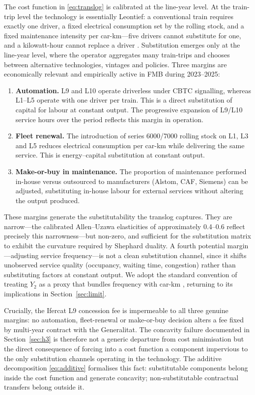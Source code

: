 \documentclass[11pt,a4paper]{article}
\begin{document}
The cost function in \eqref{eq:translog} is calibrated at the line-year
level. At the train-trip level the technology is essentially Leontief: a
conventional train requires exactly one driver, a fixed electrical
consumption set by the rolling stock, and a fixed maintenance intensity
per car-km---five drivers cannot substitute for one, and a kilowatt-hour
cannot replace a driver \citep{small2007}. Substitution emerges only at
the line-year level, where the operator aggregates many train-trips and
chooses between alternative technologies, vintages and policies. Three
margins are economically relevant and empirically active in FMB during
2023--2025:
\begin{enumerate}[leftmargin=*,topsep=2pt,label=(\alph*)]
\item \textbf{Automation.} L9 and L10 operate driverless under CBTC
signalling, whereas L1--L5 operate with one driver per train. This is a
direct substitution of capital for labour at constant output. The
progressive expansion of L9/L10 service hours over the period reflects
this margin in operation.
\item \textbf{Fleet renewal.} The introduction of series 6000/7000
rolling stock on L1, L3 and L5 reduces electrical consumption per car-km
while delivering the same service. This is energy--capital substitution
at constant output.
\item \textbf{Make-or-buy in maintenance.} The proportion of maintenance
performed in-house versus outsourced to manufacturers (Alstom, CAF,
Siemens) can be adjusted, substituting in-house labour for external
services without altering the output produced.
\end{enumerate}

These margins generate the substitutability the translog captures. They
are narrow---the calibrated Allen--Uzawa elasticities of approximately
0.4--0.6 reflect precisely this narrowness---but non-zero, and sufficient
for the substitution matrix to exhibit the curvature required by Shephard
duality. A fourth potential margin---adjusting service frequency---is not
a clean substitution channel, since it shifts unobserved service quality
(occupancy, waiting time, congestion) rather than substituting factors at
constant output. We adopt the standard convention of treating $Y_2$ as a
proxy that bundles frequency with car-km \citep{farsi2006,daraio2016},
returning to its implications in Section~\ref{sec:limit}.

Crucially, the Ifercat L9 concession fee is impermeable to all three
genuine margins: no automation, fleet-renewal or make-or-buy decision
alters a fee fixed by multi-year contract with the Generalitat. The
concavity failure documented in Section~\ref{sec:h3} is therefore not a
generic departure from cost minimisation but the direct consequence of
forcing into a cost function a component impervious to the only
substitution channels operating in the technology. The additive
decomposition \eqref{eq:additive} formalises this fact: substitutable
components belong inside the cost function and generate concavity;
non-substitutable contractual transfers belong outside it.
\end{document}

